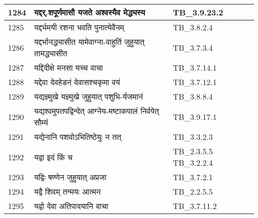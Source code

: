 \documentclass[17pt]{extarticle}
\begin{document}
\begin{longtable}{||p{0.4in}||p{4.9in}||p{0.9in}||}
    1284 & यद्दर्.शपूर्णमासौ यजते अश्वस्यैव मेद्ध्यस्य & TB\_3.9.23.2       \\
    
    \hline
        
    1285 & यद्दर्भमयी रशना भवति पुनात्येवैनम् & TB\_3.8.2.4       \\
    
    \hline
        
    1286 & यद्दर्भानद्ध्यासीत यामेवाग्ना{-}वाहुतिं जुहुयात् तामद्ध्यासीत & TB\_3.7.3.4       \\
    
    \hline
        
    1287 & यद्दिदीक्षे मनसा यच्च वाचा & TB\_3.7.14.1       \\
    
    \hline
        
    1288 & यद्देवा देवहेडनं देवासश्चकृमा वयं & TB\_3.7.12.1       \\
    
    \hline
        
    1289 & यद्यज्ञ्मुखे यज्ञ्मुखे जुहुयात् पशुभि{-}र्यजमानं & TB\_3.8.8.4       \\
    
    \hline
        
    1290 & यद्यश्वमुपतपद्विन्देत् आग्नेय{-}मष्टाकपालं निर्वपेत् सौम्यं & TB\_3.9.17.1       \\
    
    \hline
        
    1291 & यद्येनानि पशवोऽभितिष्ठेयुः न तत् & TB\_3.3.2.3       \\
    
    \hline
        
    1292 & यद्वा इदं किं च & TB\_2.3.5.5 TB\_3.2.2.4       \\
    
    \hline
        
    1293 & यद्विः षण्णेन जुहुयात् अप्रजा & TB\_3.7.2.1       \\
    
    \hline
        
    1294 & यद्वै शिवम् तन्मयः आत्मन & TB\_2.2.5.5       \\
    
    \hline
        
    1295 & यद्वो देवा अतिपादयानि वाचा & TB\_3.7.11.2       \\
    
    \hline
        

\end{longtable}
\end{document}
